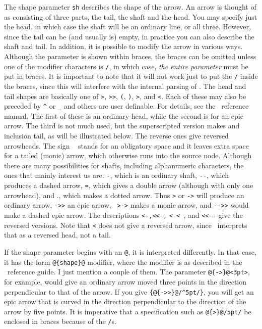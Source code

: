\documentclass[12pt]{article}
\begin{document}
{The shape parameter \verb.sh. describes the shape of the arrow.  An
arrow is thought of as consisting of three parts, the tail, the shaft
and the head.  You may specify just the head, in which case the shaft
will be an ordinary line, or all three.  However, since the tail can be
(and usually is) empty, in practice you can also describe the shaft and
tail.  In addition, it is possible to modify the arrow in various ways.
Although the parameter is shown within braces, the braces can be omitted
unless one of the modifier characters is \verb./., in which case, {\em
the entire parameter} must be put in braces.  It is important to note
that it will not work just to put the \verb./. inside the braces, since
this will interfere with the internal parsing of \xypic.  The head and
tail shapes are basically one of \index{>}\verb.>., \index{>>}\verb.>>.,
\verb.(., \verb.)., \index{>}\verb*+>+, and \index{<}\verb*+<+.  Each of
these may also be preceded by \index{^}\verb.^. or \index{_}\verb._. and
others are user definable.  For details, see the \xypic\ reference
manual.  The first of these is an ordinary head, while the second is for
an epic arrow.  The third is not much used, but the superscripted
version makes and inclusion tail, as will be illustrated below.  The
reverse ones give reversed arrowheads.  The sign \verb*+ + stands for an
obligatory space and it leaves extra space for a tailed (monic) arrow,
which otherwise runs into the source node.  Although there are many
possibilities for shafts, including alphanumeric characters, the ones
that mainly interest us are:  \index{-}\verb.-., which is an ordinary
shaft, \index{--}\verb.--., which produces a dashed arrow,
\index{=}\verb.=., which gives a double arrow (although with only one
arrowhead), and ., which makes a dotted arrow.  Thus \index{>}\verb.>.
or \index{->}\verb.->. will produce an ordinary arrow,
\index{->>}\verb.->>. an epic arrow, \index{ >->}\verb*+ >->+ makes a
monic arrow, and \index{-->>}\verb.-->>. would make a dashed epic arrow.
The descriptions \index{<-}\index{<<-}\verb.<-,<<-,.  \index{<-<
}\verb*+<-< +, and \index{<<--}\verb.<<--. give the reversed versions.
Note that \index{<}\verb.<. does not give a reversed arrow, since
\xypic\ interprets that as a reversed head, not a tail.

If the shape parameter begins with an \verb.@., it is
interpreted differently.  In that case, it has the form
\verb.@{shape}@. modifier, where the modifier is as
described in the \xypic\ reference guide.  I just mention a couple of
them.  The parameter \verb.@{->}@<3pt>., for example,
would give an ordinary arrow moved three points in the direction
perpendicular to that of the arrow.  If you give
\verb.{@{->>}@/^5pt/}., you will get an epic
arrow that is curved in the direction perpendicular to the direction of
the arrow by five points.  It is imperative that a specification such as
\verb.@{>}@/5pt/. be enclosed in braces because of the
\index{/}\verb./.s.

}
\end{document}
